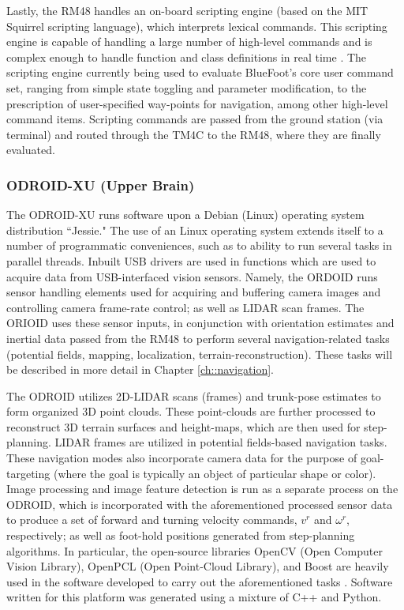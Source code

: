 			Lastly, the RM48 handles an on-board scripting engine (based on the MIT Squirrel scripting language), which interprets lexical commands. This scripting engine is capable of handling a large number of high-level commands and is complex enough to handle function and class definitions in real time \cite{Squirrel_website}. The scripting engine currently being used to evaluate BlueFoot's core user command set, ranging from simple state toggling and parameter modification, to the prescription of user-specified way-points for navigation, among other high-level command items. Scripting commands are passed from the ground station (via terminal) and routed through the TM4C to the RM48, where they are finally evaluated.

		\subsubsection{ODROID-XU (Upper Brain)}

			The ODROID-XU runs software upon a Debian (Linux) operating system distribution ``Jessie." The use of an Linux operating system extends itself to a number of programmatic conveniences, such as to ability to run several tasks in parallel threads. Inbuilt USB drivers are used in functions which are used to acquire data from USB-interfaced vision sensors. Namely, the ORDOID runs sensor handling elements used for acquiring and buffering camera images and controlling camera frame-rate control; as well as LIDAR scan frames. The ORIOID uses these sensor inputs, in conjunction with orientation estimates and inertial data passed from the RM48 to perform several navigation-related tasks (\EG potential fields, mapping, localization, terrain-reconstruction). These tasks will be described in more detail in Chapter \ref{ch::navigation}.

			The ODROID utilizes 2D-LIDAR scans (frames) and trunk-pose estimates to form organized 3D point clouds. These point-clouds are further processed to reconstruct 3D terrain surfaces and height-maps, which are then used for step-planning. LIDAR frames are utilized in potential fields-based navigation tasks. These navigation modes also incorporate camera data for the purpose of goal-targeting (where the goal is typically an object of particular shape or color). Image processing and image feature detection is run as a separate process on the ODROID, which is incorporated with the aforementioned processed sensor data to produce a set of forward and turning velocity commands, $v^{r}$ and $\omega^{r}$, respectively; as well as foot-hold positions generated from step-planning algorithms. In particular, the open-source libraries OpenCV (Open Computer Vision Library), OpenPCL (Open Point-Cloud Library), and Boost are heavily used in the software developed to carry out the aforementioned tasks \cite{opencv_library,openpcl_library,boost_website}. Software written for this platform was generated using a mixture of C++ and Python.

